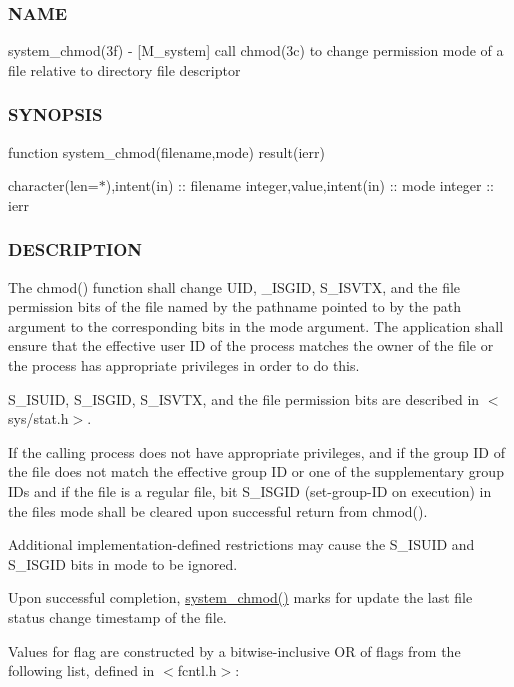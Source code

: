 \subsubsection*{N\+A\+ME}

system\+\_\+chmod(3f) -\/ \mbox{[}M\+\_\+system\mbox{]} call chmod(3c) to change permission mode of a file relative to directory file descriptor \subsubsection*{S\+Y\+N\+O\+P\+S\+IS}

function system\+\_\+chmod(filename,mode) result(ierr)

character(len=$\ast$),intent(in) \+:\+: filename integer,value,intent(in) \+:\+: mode integer \+:\+: ierr

\subsubsection*{D\+E\+S\+C\+R\+I\+P\+T\+I\+ON}

The chmod() function shall change U\+ID, \+\_\+\+I\+S\+G\+ID, S\+\_\+\+I\+S\+V\+TX, and the file permission bits of the file named by the pathname pointed to by the path argument to the corresponding bits in the mode argument. The application shall ensure that the effective user ID of the process matches the owner of the file or the process has appropriate privileges in order to do this.

S\+\_\+\+I\+S\+U\+ID, S\+\_\+\+I\+S\+G\+ID, S\+\_\+\+I\+S\+V\+TX, and the file permission bits are described in $<$sys/stat.\+h$>$.

If the calling process does not have appropriate privileges, and if the group ID of the file does not match the effective group ID or one of the supplementary group I\+Ds and if the file is a regular file, bit S\+\_\+\+I\+S\+G\+ID (set-\/group-\/\+ID on execution) in the file\textquotesingle{}s mode shall be cleared upon successful return from chmod().

Additional implementation-\/defined restrictions may cause the S\+\_\+\+I\+S\+U\+ID and S\+\_\+\+I\+S\+G\+ID bits in mode to be ignored.

Upon successful completion, \hyperlink{namespacem__system_ace9ce0c8a9c8341a76b8903cd2390ce3}{system\+\_\+chmod()} marks for update the last file status change timestamp of the file.

Values for flag are constructed by a bitwise-\/inclusive OR of flags from the following list, defined in $<$fcntl.\+h$>$\+:

